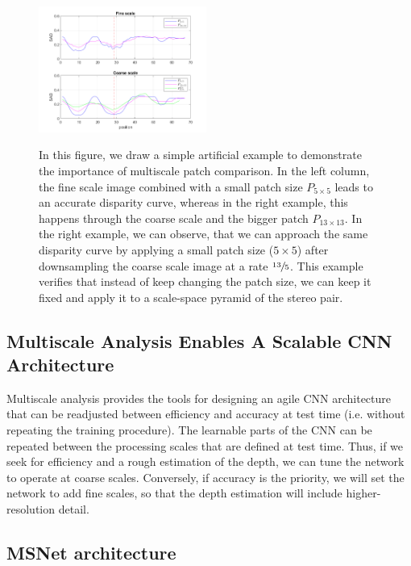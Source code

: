 \documentclass[runningheads]{llncs}
\begin{document}
\begin{figure}[t]
\begin{center}
        \includegraphics[width=0.49\textwidth]{paper/latex/figures/low_resolution_success_graph.png}\\
        
    \end{center}
    
    \caption{In this figure, we draw a simple artificial example to demonstrate the importance of multiscale patch comparison. In the left column, the fine scale image combined with a small patch size $P_{5 \times 5}$ leads to an accurate disparity curve, whereas in the right example, this happens through the coarse scale and the bigger patch $P_{13 \times 13}$. In the right example, we can observe, that we can approach the same disparity curve by applying a small patch size ($5 \times 5$) after downsampling the coarse scale image at a rate $\sfrac{13}{5}$. This example verifies that instead of keep changing the patch size, we can keep it fixed and apply it to a scale-space pyramid of the stereo pair.}
    \label{fig:multiscale_importance_2D}
\end{figure}

\subsection{Multiscale Analysis Enables A Scalable CNN Architecture}

Multiscale analysis provides the tools for designing an agile CNN architecture that can be readjusted between efficiency and accuracy at test time (i.e. without repeating the training procedure). The learnable parts of the CNN can be repeated between the processing scales that are defined at test time. Thus, if we seek for efficiency and a rough estimation of the depth, we can tune the network to operate at coarse scales. Conversely, if accuracy is the priority, we will set the network to add fine scales, so that the depth estimation will include higher-resolution detail.

\subsection{MSNet architecture}
\end{document}
